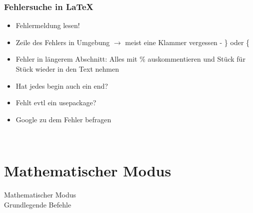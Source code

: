\documentclass{beamer}
\begin{document}
\begin{frame}
\frametitle{Fehlersuche in \LaTeX}
  \begin{itemize}
    \item<1-> Fehlermeldung lesen!
    \item<2-> Zeile des Fehlers in Umgebung $\rightarrow$ meist eine Klammer vergessen - \} oder \{
    \item<3-> Fehler in längerem Abschnitt: Alles mit \% auskommentieren und Stück für Stück wieder in den Text nehmen
    \item<4-> Hat jedes \alert<4>{begin} auch ein \alert<4>{end}?
    \item<5-> Fehlt evtl ein \alert<5>{usepackage}?
    \item<6-> Google zu dem Fehler befragen
  \end{itemize}
\end{frame}



\begin{frame}
 \begin{center}
  \Large {} \\
 \end{center}
\end{frame}



 \section{Mathematischer Modus}
 \begin{frame}
  \begin{center}
   \Huge Mathematischer Modus \\
   \Large Grundlegende Befehle
  \end{center}
 \end{frame}
 
\end{document}

